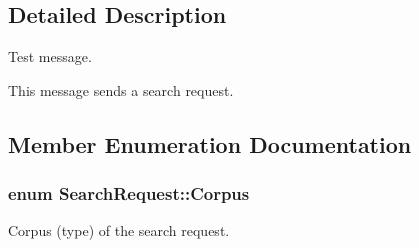 \subsection{Detailed Description}
Test message. 

This message sends a search request. 

\subsection{Member Enumeration Documentation}
\subsubsection[{\texorpdfstring{Corpus}{Corpus}}]{\setlength{\rightskip}{0pt plus 5cm}enum {\bf Search\+Request\+::\+Corpus}}\hypertarget{structSearchRequest_ac8fbf72607c24a8ebaee257fec80e7fa}{}\label{structSearchRequest_ac8fbf72607c24a8ebaee257fec80e7fa}


Corpus (type) of the search request. 

